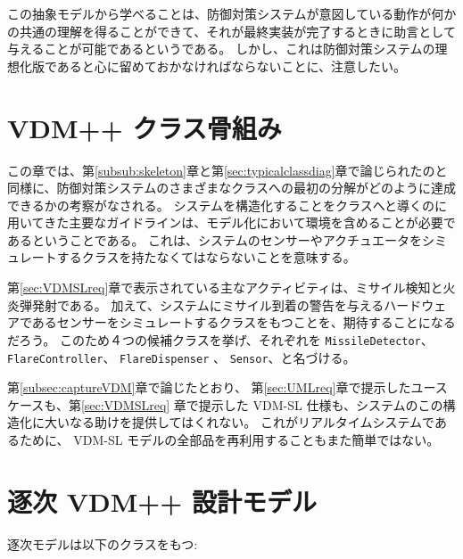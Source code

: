 \documentclass[\pformat,12pt]{jreport}
\begin{document}
この抽象モデルから学べることは、防御対策システムが意図している動作が何かの共通の理解を得ることができて、それが最終実装が完了するときに助言として与えることが可能であるというである。
しかし、これは防御対策システムの理想化版であると心に留めておかなければならないことに、注意したい。

\section{VDM++ クラス骨組み}\label{sec:skeleton}

この章では、第\ref{subsub:skeleton}章と第\ref{sec:typicalclassdiag}章で論じられたのと同様に、防御対策システムのさまざまなクラスへの最初の分解がどのように達成できるかの考察がなされる。
システムを構造化することをクラスへと導くのに用いてきた主要なガイドラインは、モデル化において環境を含めることが必要であるということである。
これは、システムのセンサーやアクチュエータをシミュレートするクラスを持たなくてはならないことを意味する。

第\ref{sec:VDMSLreq}章で表示されている主なアクティビティは、ミサイル検知と火炎弾発射である。
加えて、システムにミサイル到着の警告を与えるハードウェアであるセンサーをシミュレートするクラスをもつことを、期待することになるだろう。
このため４つの候補クラスを挙げ、それぞれを \texttt{MissileDetector}、\texttt{FlareController}、 \texttt{FlareDispenser} 、 \texttt{Sensor}、と名づける。

第\ref{subsec:captureVDM}章で論じたとおり、 第\ref{sec:UMLreq}章で提示したユースケースも、第\ref{sec:VDMSLreq} 章で提示した VDM-SL 仕様も、システムのこの構造化に大いなる助けを提供してはくれない。
これがリアルタイムシステムであるために、 VDM-SL モデルの全部品を再利用することもまた簡単ではない。

\section{逐次 VDM++ 設計モデル}\label{sec:seqVDM}\label{sec:sequential}

逐次モデルは以下のクラスをもつ:
\end{document}
